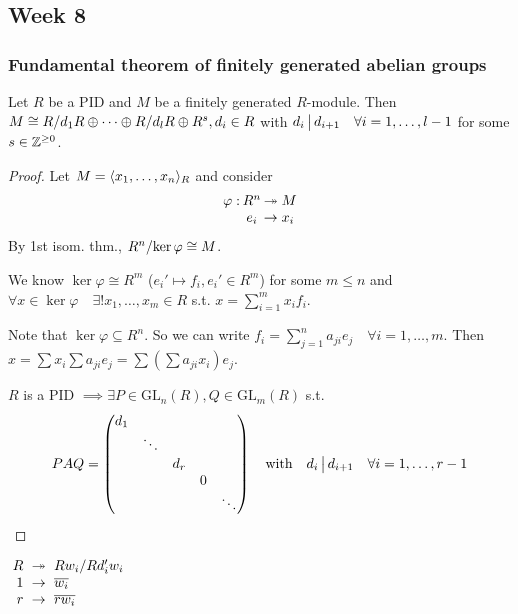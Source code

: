 \subsection{Week 8}
\subsubsection{Fundamental theorem of finitely generated abelian groups}

\begin{theorem}
  Let $R$ be a PID and $M$ be a finitely generated $R$-module.
  Then $M \cong {R}/{d_1 R} \oplus \dots \oplus {R}/{d_l R} \oplus R^s,
  d_i \in R$ with $d_i \,\big|\, d_{i+1} \quad \forall i = 1, \dots, l-1$
  for some $s \in \mathbb{Z}^{\ge 0}$.

  \begin{proof}
    Let $M = \langle x_1, \dots, x_n\rangle_R$ and consider
    \[
      \arraycolsep=1pt
      \begin{array}{rcl}
        \varphi: & R^n & \onto M \\
                 & e_i & \to x_i
      \end{array}
    \]
    By 1st isom. thm., ${R^n}/{\ker \varphi} \cong M$.

    We know $\ker \varphi \cong R^m$ ($e_i' \mapsto f_i, e_i' \in R^m$)
    for some $m \le n$ and
    $\forall x \in \ker\varphi \quad \exists! x_1, \dots, x_m \in R$ s.t.
    $x = \sum_{i=1}^m x_i f_i$.

    Note that $\ker \varphi \subseteq R^n$. So we can write
    $f_i = \sum_{j=1}^n a_{ji}e_j \quad \forall i = 1,\dots, m$.
    Then $x = \sum x_i \sum a_{ji}e_j =
    \sum \left(\sum a_{ji}x_i\right) e_j$.

    $R$ is a PID $\implies \exists P \in \text{GL}_n(R), Q \in \text{GL}_m(R)$
    s.t.
    \[
      PAQ = \begin{pmatrix}
      d_1 \\
      & \ddots \\
      & & d_r \\
      & & & 0 \\
      & & & & \ddots
      \end{pmatrix}
      \quad \text{with} \quad
      d_i \,\big|\, d_{i+1} \quad \forall i = 1, \dots, r-1
    \]
  \end{proof}

  $\arraycolsep=3pt
  \begin{array}{rcl}
    R & \onto & \quot{Rw_i}{Rd_i'w_i} \\
    1 & \to & \ob{w_i} \\
    r & \to & \ob{rw_i}
  \end{array}
    $
\end{theorem}

